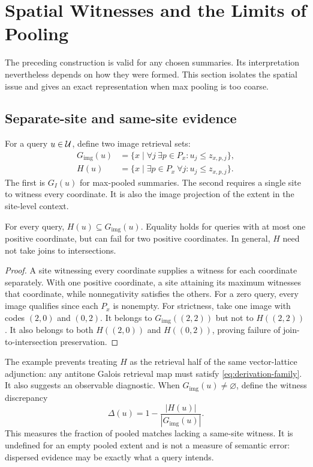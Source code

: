 \section{Spatial Witnesses and the Limits of Pooling}
\label{sec:spatial}
The preceding construction is valid for any chosen summaries. Its
interpretation nevertheless depends on how they were formed. This
section isolates the spatial issue and gives an exact representation
when max pooling is too coarse.

\subsection{Separate-site and same-site evidence}
\label{sub:spatial-witnesses}
For a query $u\in\mathcal{U}$, define two image retrieval sets:
\begin{equation}\label{eq:spatial-extents}
  \begin{aligned}
    G_{\mathrm{img}}(u)
         & =\{x\mid \forall j\ \exists p\in P_{x}: u_{j}\leq z_{x,p,j}\}, \\
    H(u) & =\{x\mid \exists p\in P_{x}\ \forall j: u_{j}\leq z_{x,p,j}\}.
  \end{aligned}
\end{equation}
The first is $G_{I}(u)$ for max-pooled summaries. The second requires a
single site to witness every coordinate. It is also the image projection
of the extent in the site-level context.

\begin{proposition}
  \label{prop:spatial-relaxation}
  For every query, $H(u)\subseteq G_{\mathrm{img}}(u)$. Equality holds for
  queries with at most one positive coordinate, but can fail for two
  positive coordinates. In general, $H$ need not take joins to intersections.
\end{proposition}
\begin{proof}
  A site witnessing every coordinate supplies a witness for each coordinate
  separately. With one positive coordinate, a site attaining its maximum
  witnesses that coordinate, while nonnegativity satisfies the others.
  For a zero query, every image qualifies since each $P_{x}$ is nonempty.
  For strictness, take one image with codes $(2,0)$ and $(0,2)$. It belongs
  to $G_{\mathrm{img}}((2,2))$ but not to $H((2,2))$. It also belongs to
  both $H((2,0))$ and $H((0,2))$, proving failure of join-to-intersection
  preservation.
\end{proof}

The example prevents treating $H$ as the retrieval half of the same
vector-lattice adjunction: any antitone Galois retrieval map must satisfy
\cref{eq:derivation-family}. It also suggests an observable diagnostic.
When $G_{\mathrm{img}}(u)\neq\varnothing$, define the witness discrepancy
\begin{equation}\label{eq:witness-discrepancy}
  \Delta(u)=1-\frac{|H(u)|}{|G_{\mathrm{img}}(u)|}.
\end{equation}
This measures the fraction of pooled matches lacking a same-site
witness. It is undefined for an empty pooled extent and is not a measure
of semantic error: dispersed evidence may be exactly what a query intends.

